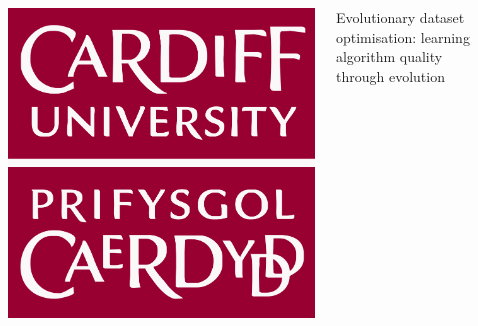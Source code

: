 \documentclass{beamer}
\begin{document}
\color{mygrey}

\begin{columns}
    \begin{column}{0.1\textwidth}
        \vspace{2em}

        \centering%
        \includegraphics[width=\linewidth]{img/cu_logo}
    \end{column}

    \begin{column}{0.75\textwidth}
        \vspace{2em}

        \centering%
        {%
            \fontsize{60}{72}\selectfont%
            Evolutionary dataset optimisation:\vspace{.5ex}
            learning algorithm quality through evolution
        }
    \end{column}

    \begin{column}{0.1\textwidth}
        \vspace{2em}


\end{column}
\end{columns}
\end{document}

